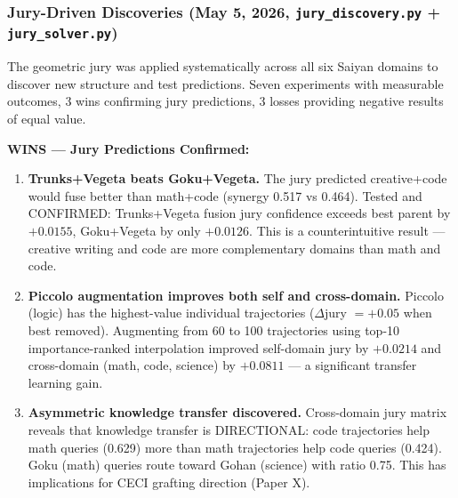 \documentclass[11pt]{article}
\begin{document}
\subsubsection*{Jury-Driven Discoveries (May 5, 2026, \texttt{jury\_discovery.py} + \texttt{jury\_solver.py})}

The geometric jury was applied systematically across all six Saiyan domains to discover new structure and test predictions. Seven experiments with measurable outcomes, 3 wins confirming jury predictions, 3 losses providing negative results of equal value.

\textbf{WINS --- Jury Predictions Confirmed:}
\begin{enumerate}[nosep]
\item \textbf{Trunks+Vegeta beats Goku+Vegeta.} The jury predicted creative+code would fuse better than math+code (synergy 0.517 vs 0.464). Tested and CONFIRMED: Trunks+Vegeta fusion jury confidence exceeds best parent by $+0.0155$, Goku+Vegeta by only $+0.0126$. This is a counterintuitive result --- creative writing and code are more complementary domains than math and code.
\item \textbf{Piccolo augmentation improves both self and cross-domain.} Piccolo (logic) has the highest-value individual trajectories ($\Delta$jury $= +0.05$ when best removed). Augmenting from 60 to 100 trajectories using top-10 importance-ranked interpolation improved self-domain jury by $+0.0214$ and cross-domain (math, code, science) by $+0.0811$ --- a significant transfer learning gain.
\item \textbf{Asymmetric knowledge transfer discovered.} Cross-domain jury matrix reveals that knowledge transfer is DIRECTIONAL: code trajectories help math queries (0.629) more than math trajectories help code queries (0.424). Goku (math) queries route toward Gohan (science) with ratio 0.75. This has implications for CECI grafting direction (Paper X).
\end{enumerate}
\end{document}

